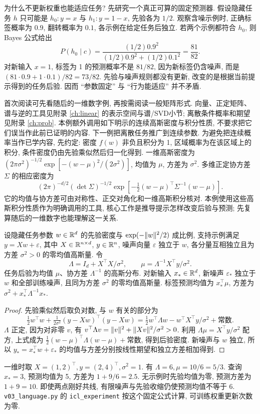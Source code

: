 为什么不更新权重也能适应任务? 先研究一个真正可算的固定预测器. 假设隐藏任务 $h$ 只可能是 $h_0:y=x$ 与 $h_1:y=1-x$, 先验各为 $1/2$. 观察含噪示例时, 正确标签概率为 $0.9$, 翻转概率为 $0.1$, 各示例在给定任务后独立. 若两个示例都符合 $h_0$, 则 Bayes 公式给出
\[
P(h_0\mid c)=\frac{(1/2)0.9^2}{(1/2)0.9^2+(1/2)0.1^2}=\frac{81}{82}.
\]
对新输入 $x=1$, 标签为 1 的预测概率不是 $81/82$, 因为新标签仍含噪声, 而是 $(81\cdot0.9+1\cdot0.1)/82=73/82$. 先验与噪声规则都没有更新, 改变的是根据当前提示得到的任务后验. 因而 ``参数固定'' 与 ``行为能适应'' 并不矛盾.

首次阅读可先看随后的一维数字例, 再按需阅读一般矩阵形式. 向量、正定矩阵、谱与逆的工具见附录 \ref{ch:linear} 的表示空间与谱/SVD小节; 离散条件概率和期望见附录 \ref{ch:prob}. 本例额外调用如下明示的连续高斯密度与积分性质, 不要求把它们误当作此前已证明的内容. 下一例把离散任务推广到连续参数. 为避免把连续概率当作已学内容, 先约定: 密度 $f(w)$ 非负且积分为 1, 区域概率为在该区域上的积分, 条件密度仍由先验乘似然后归一化得到. 一维高斯密度为 $(2\pi\sigma^2)^{-1/2}\exp[-(w-\mu)^2/(2\sigma^2)]$, 均值为 $\mu$, 方差为 $\sigma^2$. 多维正定协方差 $\Sigma$ 的相应密度为
\[
(2\pi)^{-d/2}(\det\Sigma)^{-1/2}
\exp[-\tfrac12(w-\mu)^\top\Sigma^{-1}(w-\mu)].
\]
它的均值与协方差可由对称性、正交对角化和一维高斯积分核对. 本例使用这些高斯积分性质作为明确调用的工具, 核心工作是推导提示怎样改变后验与预测; 先复算随后的一维数字也能理解这一关系.

\begin{proposition}
设隐藏任务参数 $w\in\mathbb R^d$ 的先验密度与 $\exp(-\lVert w\rVert^2/2)$ 成比例, 支持示例满足 $y=Xw+\varepsilon$, 其中 $X\in\mathbb R^{n\times d}$, $y\in\mathbb R^n$, 噪声向量 $\varepsilon$ 独立于 $w$, 各分量互相独立且为方差 $\sigma^2>0$ 的零均值高斯量. 令
\[
\Lambda=I_d+X^\top X/\sigma^2,\qquad
\mu=\Lambda^{-1}X^\top y/\sigma^2.
\]
任务后验为均值 $\mu$、协方差 $\Lambda^{-1}$ 的高斯分布. 对新输入 $x_*\in\mathbb R^d$, 新噪声 $\varepsilon_*$ 独立于 $w$ 和全部训练噪声, 且同为方差 $\sigma^2$ 的零均值高斯量. 标签预测均值为 $x_*^\top\mu$, 方差为 $\sigma^2+x_*^\top\Lambda^{-1}x_*$.
\end{proposition}
\begin{proof}
先验乘似然后取负对数, 与 $w$ 有关的部分为
\[
\tfrac12w^\top w+\tfrac1{2\sigma^2}(y-Xw)^\top(y-Xw)
=\tfrac12w^\top\Lambda w-w^\top X^\top y/\sigma^2+\text{常数}.
\]
$\Lambda$ 正定, 因为对非零 $v$, 有 $v^\top\Lambda v=\lVert v\rVert^2+\lVert Xv\rVert^2/\sigma^2>0$. 利用 $\Lambda\mu=X^\top y/\sigma^2$ 配方, 上式成为 $\tfrac12(w-\mu)^\top\Lambda(w-\mu)+\text{常数}$, 得到后验密度. 新噪声与 $w$ 独立, 所以 $y_*=x_*^\top w+\varepsilon_*$ 的均值与方差分别按线性期望和独立方差相加得到.
\end{proof}
一维时取 $X=(1,2)^\top,y=(2,4)^\top,\sigma^2=1$. 有 $\Lambda=6,\mu=10/6=5/3$. 查询 $x_*=3$, 预测均值为 5, 方差为 $1+9/6=2.5$. 无示例时先验均值为零, 预测方差为 $1+9=10$. 即使两点刚好共线, 有限噪声与先验收缩仍使预测均值不等于 6. \texttt{v03\_language.py} 的 \texttt{icl\_experiment} 按这个固定公式计算, 可训练权重更新次数为零.

